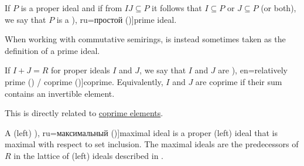 \begin{definition}
\begin{thmenum}[resume=def:semiring_ideal]
     If \( P \) is a proper ideal and if from \( IJ \subseteq P \) it follows that \( I \subseteq P \) or \( J \subseteq P \) (or both), we say that \( P \) is a \term[bg=прост (\cite[7]{КоцевСидеров2016}), ru=простой (\cite[14]{ВечтомовПетров2022})]{prime ideal}.

    When working with commutative semirings,  is instead sometimes taken as the definition of a prime ideal.

     If \( I + J = R \) for proper ideals \( I \) and \( J \), we say that \( I \) and \( J \) are \term[bg=взаимно прости (\cite[18]{КоцевСидеров2016}), en=relatively prime (\cite[116]{Lang2002}) / coprime (\cite[exer. 5.9(ii)]{Rotman2010})]{coprime}. Equivalently, \( I \) and \( J \) are coprime if their sum contains an invertible element.

    This is directly related to \hyperref[def:coprime_elements]{coprime elements}.

     A (left) \term[bg=максимален (\cite[7]{КоцевСидеров2016}), ru=максимальный (\cite[13]{ВечтомовПетров2022})]{maximal ideal} is a proper (left) ideal that is maximal with respect to set inclusion. The maximal ideals are the predecessors of \( R \) in the lattice of (left) ideals described in .
  \end{thmenum}
\end{definition}

